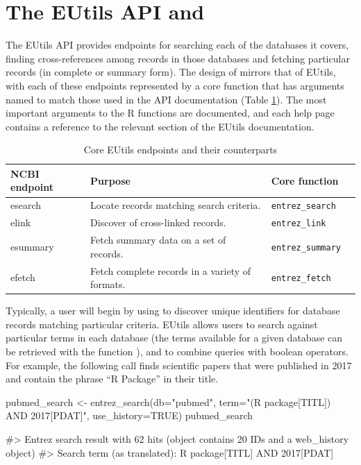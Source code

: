 \section{The EUtils API and  }

The EUtils API provides endpoints for searching each of the databases it covers, 
finding cross-references among records in those databases and fetching 
particular records (in complete or summary form). The design of  
mirrors that of EUtils, with each of these endpoints represented by a core
function that has arguments named to match those used in the API documentation
(Table \ref{tab:core-ends}). The most important arguments to the R functions are
documented, and each help page contains a reference to the relevant section of 
the EUtils documentation.

\begin{table}[]
\centering
\caption{Core EUtils endpoints and their  counterparts}
\label{tab:core-ends}
\begin{tabular}{llll}
\hline
NCBI endpoint & Purpose                                         & Core function            \\ \hline
esearch       & Locate records matching search criteria.        & \texttt{entrez\_search}  \\
elink         & Discover of cross-linked records.               & \texttt{entrez\_link}    \\ 
esummary      & Fetch summary data on a set of records.         & \texttt{entrez\_summary} \\ 
efetch        & Fetch complete records in a variety of formats. & \texttt{entrez\_fetch}   \\ \hline
\end{tabular}
\end{table}


Typically, a user will begin by using  to discover unique
identifiers for database records matching particular criteria. EUtils allows
users to search against particular terms in each database (the terms available
for a given database can be retrieved with the function
), and to combine queries with boolean operators. 
For example, the following call finds scientific papers that were published in 2017 
and contain the phrase ``R Package'' in their title.

\begin{example}
pubmed_search <- entrez_search(db="pubmed", 
                               term="(R package[TITL]) AND 2017[PDAT]", 
                               use_history=TRUE)
pubmed_search

#> Entrez search result with 62 hits (object contains 20 IDs and a web_history object)
#>  Search term (as translated):  R package[TITL] AND 2017[PDAT]
\end{example}

